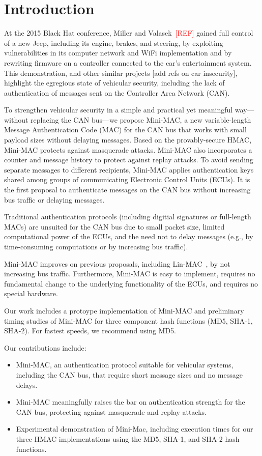 \section{Introduction}
\label{intro}

At the 2015 Black Hat conference, Miller and Valasek~\textcolor{red}{[REF]} gained full control of a new Jeep,
including its engine, brakes, and steering, by exploiting vulnerabilities in its
computer network and WiFi implementation and by rewriting firmware on a controller connected to the car's entertainment system.
This demonstration, and other similar projects [add refs on car insecurity], 
highlight the egregious state of vehicular security, including the lack of 
authentication of messages sent on the Controller Area Network (CAN).   

To strengthen vehicular security in a simple and practical 
yet meaningful way---without replacing the CAN bus---we propose Mini-MAC, 
a new variable-length Message Authentication Code (MAC)
for the CAN bus that works with small payload sizes without delaying messages.  
Based on the provably-secure HMAC, Mini-MAC protects against masquerade attacks.  
Mini-MAC also incorporates a counter and message history to protect against replay attacks.
To avoid sending separate messages to different recipients, Mini-MAC applies authentication keys
shared among groups of communicating Electronic Control Units (ECUs).
It is the first proposal to authenticate messages on the CAN bus without increasing bus traffic
or delaying messages. 

Traditional authentication protocols (including digitial signatures or full-length MACs) are unsuited for the CAN bus due to
small packet size, limited computational power of the ECUs,
and the need not to delay messages (e.g., by time-consuming computations or by
increasing bus traffic).   

Mini-MAC improves on previous proposals, including Lin-MAC~\cite{Lin-MAC}, by not increasing bus traffic.
Furthermore, Mini-MAC is easy to implement,
requires no fundamental change to the underlying functionality of the ECUs, and 
requires no special hardware.

Our work includes a protoype implementation of Mini-MAC and preliminary timing studies 
of Mini-MAC for three component hash functions (MD5, SHA-1, SHA-2).  For fastest speeds, 
we recommend using MD5.

Our contributions include:
\begin{itemize}

\item Mini-MAC, an authentication protocol suitable for vehicular systems, including the CAN bus, 
that require short message sizes and no message delays.

\item Mini-MAC meaningfully raises the bar on authentication strength for the CAN bus, protecting against
masquerade and replay attacks.

\item Experimental demonstration of Mini-Mac, including execution times for our three HMAC
implementations using the MD5, SHA-1, and SHA-2 hash functions.

\end{itemize}